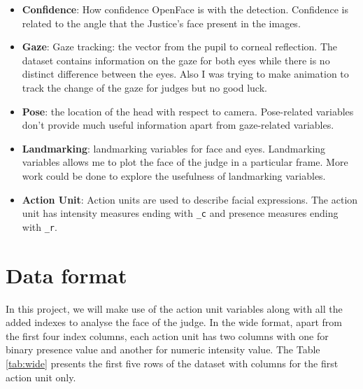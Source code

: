 \documentclass{monashthesis}
\begin{document}
\begin{itemize}
\item
  \textbf{Confidence}: How confidence OpenFace is with the detection. Confidence is related to the angle that the Justice's face present in the images.
\item
  \textbf{Gaze}: Gaze tracking: the vector from the pupil to corneal reflection. The dataset contains information on the gaze for both eyes while there is no distinct difference between the eyes. Also I was trying to make animation to track the change of the gaze for judges but no good luck.
\item
  \textbf{Pose}: the location of the head with respect to camera. Pose-related variables don't provide much useful information apart from gaze-related variables.
\item
  \textbf{Landmarking}: landmarking variables for face and eyes. Landmarking variables allows me to plot the face of the judge in a particular frame. More work could be done to explore the usefulness of landmarking variables.
\item
  \textbf{Action Unit}: Action units are used to describe facial expressions. The action unit has intensity measures ending with \texttt{\_c} and presence measures ending with \texttt{\_r}.
\end{itemize}

\hypertarget{data-format}{%
\section{Data format}\label{data-format}}

In this project, we will make use of the action unit variables along with all the added indexes to analyse the face of the judge. In the wide format, apart from the first four index columns, each action unit has two columns with one for binary presence value and another for numeric intensity value. The Table \ref{tab:wide} presents the first five rows of the dataset with columns for the first action unit only.
\end{document}
